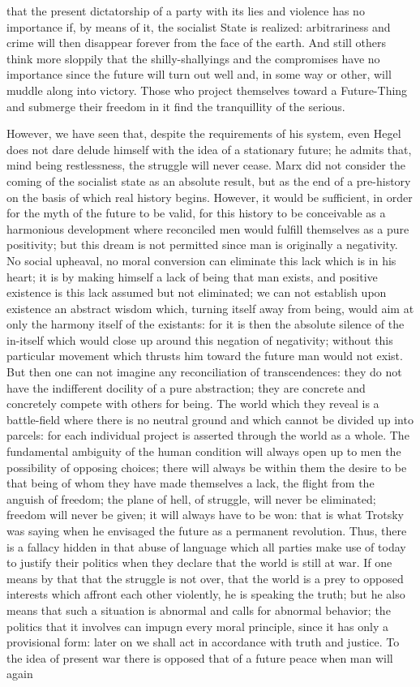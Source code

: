 \documentclass[11pt]{article}
\begin{document}
{{that the present dictatorship of a party with its lies and violence has no importance if, by means of it, the socialist State is realized: arbitrariness and crime will then disappear forever from the face of the earth. And still others think more sloppily that the shilly-shallyings and the compromises have no importance since the future will turn out well and, in some way or other, will muddle along into victory. Those who project themselves toward a Future-Thing and submerge their freedom in it find the tranquillity of the serious.

However, we have seen that, despite the requirements of his system, even Hegel does not dare delude himself with the idea of a stationary future; he admits that, mind being restlessness, the struggle will never cease. Marx did not consider the coming of the socialist state as an absolute result, but as the end of a pre-history on the basis of which real history begins. However, it would be sufficient, in order for the myth of the future to be valid, for this history to be conceivable as a harmonious development where reconciled men would fulfill themselves as a pure positivity; but this dream is not permitted since man is originally a negativity. No social upheaval, no moral conversion can eliminate this lack which is in his heart; it is by making himself a lack of being that man exists, and positive existence is this lack assumed but not eliminated; we can not establish upon existence an abstract wisdom which, turning itself away from being, would aim at only the harmony itself of the existants: for it is then the absolute silence of the in-itself which would close up around this negation of negativity; without this particular movement which thrusts him toward the future man would not exist. But then one can not imagine any reconciliation of transcendences: they do not have the indifferent docility of a pure abstraction; they are concrete and concretely compete with others for being. The world which they reveal is a battle-field where there is no neutral ground and which cannot be divided up into parcels: for each individual project is asserted through the world as a whole. The fundamental ambiguity of the human condition will always open up to men the possibility of opposing choices; there will always be within them the desire to be that being of whom they have made themselves a lack, the flight from the anguish of freedom; the plane of hell, of struggle, will never be eliminated; freedom will never be given; it will always have to be won: that is what Trotsky was saying when he envisaged the future as a permanent revolution. Thus, there is a fallacy hidden in that abuse of language which all parties make use of today to justify their politics when they declare that the world is still at war. If one means by that that the struggle is not over, that the world is a prey to opposed interests which affront each other violently, he is speaking the truth; but he also means that such a situation is abnormal and calls for abnormal behavior; the politics that it involves can impugn every moral principle, since it has only a provisional form: later on we shall act in accordance with truth and justice. To the idea of present war there is opposed that of a future peace when man will again }}
\end{document}
